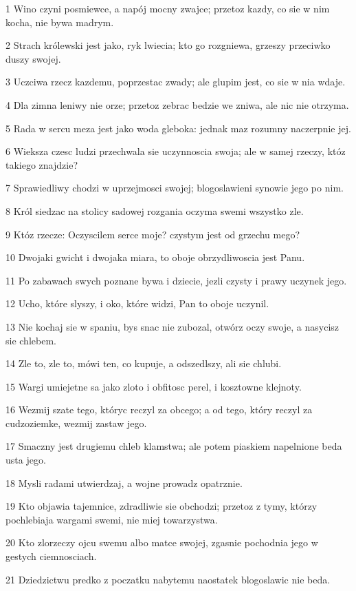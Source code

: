 \par 1 Wino czyni posmiewce, a napój mocny zwajce; przetoz kazdy, co sie w nim kocha, nie bywa madrym.
\par 2 Strach królewski jest jako, ryk lwiecia; kto go rozgniewa, grzeszy przeciwko duszy swojej.
\par 3 Uczciwa rzecz kazdemu, poprzestac zwady; ale glupim jest, co sie w nia wdaje.
\par 4 Dla zimna leniwy nie orze; przetoz zebrac bedzie we zniwa, ale nic nie otrzyma.
\par 5 Rada w sercu meza jest jako woda gleboka: jednak maz rozumny naczerpnie jej.
\par 6 Wieksza czesc ludzi przechwala sie uczynnoscia swoja; ale w samej rzeczy, któz takiego znajdzie?
\par 7 Sprawiedliwy chodzi w uprzejmosci swojej; blogoslawieni synowie jego po nim.
\par 8 Król siedzac na stolicy sadowej rozgania oczyma swemi wszystko zle.
\par 9 Któz rzecze: Oczyscilem serce moje? czystym jest od grzechu mego?
\par 10 Dwojaki gwicht i dwojaka miara, to oboje obrzydliwoscia jest Panu.
\par 11 Po zabawach swych poznane bywa i dziecie, jezli czysty i prawy uczynek jego.
\par 12 Ucho, które slyszy, i oko, które widzi, Pan to oboje uczynil.
\par 13 Nie kochaj sie w spaniu, bys snac nie zubozal, otwórz oczy swoje, a nasycisz sie chlebem.
\par 14 Zle to, zle to, mówi ten, co kupuje, a odszedlszy, ali sie chlubi.
\par 15 Wargi umiejetne sa jako zloto i obfitosc perel, i kosztowne klejnoty.
\par 16 Wezmij szate tego, któryc reczyl za obcego; a od tego, który reczyl za cudzoziemke, wezmij zastaw jego.
\par 17 Smaczny jest drugiemu chleb klamstwa; ale potem piaskiem napelnione beda usta jego.
\par 18 Mysli radami utwierdzaj, a wojne prowadz opatrznie.
\par 19 Kto objawia tajemnice, zdradliwie sie obchodzi; przetoz z tymy, którzy pochlebiaja wargami swemi, nie miej towarzystwa.
\par 20 Kto zlorzeczy ojcu swemu albo matce swojej, zgasnie pochodnia jego w gestych ciemnosciach.
\par 21 Dziedzictwu predko z poczatku nabytemu naostatek blogoslawic nie beda.
